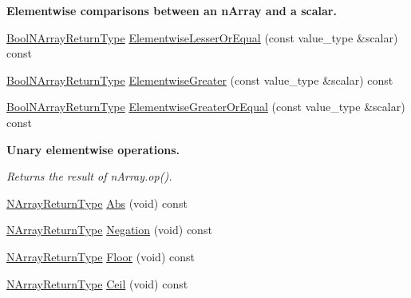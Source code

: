 \begin{Indent}{\bf Elementwise comparisons between an n\+Array and a scalar.}
\begin{DoxyCompactItemize}
\item 
\hyperlink{classvct_dynamic_const_n_array_base_a983f2b7edd51a896d447383b5a5af289}{Bool\+N\+Array\+Return\+Type} \hyperlink{classvct_dynamic_const_n_array_base_af2c00fe0d0b7695bfb41611c66137701}{Elementwise\+Lesser\+Or\+Equal} (const value\+\_\+type \&scalar) const 
\item 
\hyperlink{classvct_dynamic_const_n_array_base_a983f2b7edd51a896d447383b5a5af289}{Bool\+N\+Array\+Return\+Type} \hyperlink{classvct_dynamic_const_n_array_base_a9bc8ac6d6d65042d8957be17aedb4aff}{Elementwise\+Greater} (const value\+\_\+type \&scalar) const 
\item 
\hyperlink{classvct_dynamic_const_n_array_base_a983f2b7edd51a896d447383b5a5af289}{Bool\+N\+Array\+Return\+Type} \hyperlink{classvct_dynamic_const_n_array_base_a9a8b383d9e71ed4b6a2141c94b4263dc}{Elementwise\+Greater\+Or\+Equal} (const value\+\_\+type \&scalar) const 
\end{DoxyCompactItemize}
\end{Indent}
\begin{Indent}{\bf Unary elementwise operations.}\par
{\em Returns the result of n\+Array.\+op(). }\begin{DoxyCompactItemize}
\item 
\hyperlink{classvct_dynamic_const_n_array_base_a7507402a90022d7a14ad7038fac07041}{N\+Array\+Return\+Type} \hyperlink{classvct_dynamic_const_n_array_base_ac59e344e65a9c5af70f18c581ec49422}{Abs} (void) const 
\item 
\hyperlink{classvct_dynamic_const_n_array_base_a7507402a90022d7a14ad7038fac07041}{N\+Array\+Return\+Type} \hyperlink{classvct_dynamic_const_n_array_base_aedc44fa6c64601af5f40ef2a2b1a126c}{Negation} (void) const 
\item 
\hyperlink{classvct_dynamic_const_n_array_base_a7507402a90022d7a14ad7038fac07041}{N\+Array\+Return\+Type} \hyperlink{classvct_dynamic_const_n_array_base_acf9a195f38bcdad678d1e6ff532437f0}{Floor} (void) const 
\item 
\hyperlink{classvct_dynamic_const_n_array_base_a7507402a90022d7a14ad7038fac07041}{N\+Array\+Return\+Type} \hyperlink{classvct_dynamic_const_n_array_base_aed5a0bb491ffbeb4a9c5fb4101e5455d}{Ceil} (void) const 
\end{DoxyCompactItemize}
\end{Indent}
